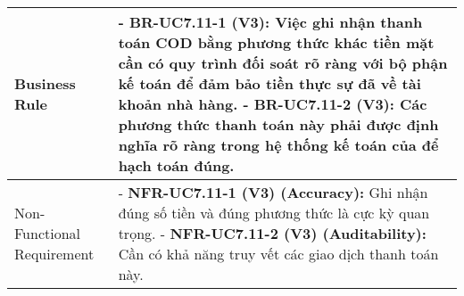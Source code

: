 \begin{longtable}{|m{4cm}|p{11cm}|}
\hline
Business Rule & - \textbf{BR-UC7.11-1 (V3):} Việc ghi nhận thanh toán COD bằng phương thức khác tiền mặt cần có quy trình đối soát rõ ràng với bộ phận kế toán để đảm bảo tiền thực sự đã về tài khoản nhà hàng. \newline - \textbf{BR-UC7.11-2 (V3):} Các phương thức thanh toán này phải được định nghĩa rõ ràng trong hệ thống kế toán của để hạch toán đúng. \\
\hline
Non-Functional Requirement & - \textbf{NFR-UC7.11-1 (V3) (Accuracy):} Ghi nhận đúng số tiền và đúng phương thức là cực kỳ quan trọng. \newline - \textbf{NFR-UC7.11-2 (V3) (Auditability):} Cần có khả năng truy vết các giao dịch thanh toán này. \\
\hline
\end{longtable}

